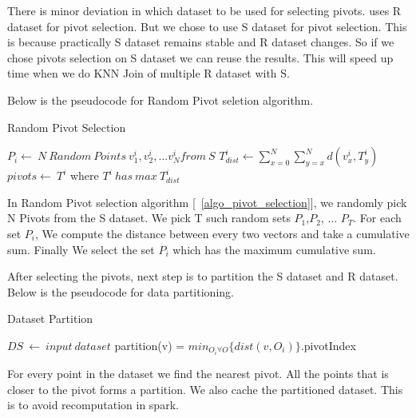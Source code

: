 There is minor deviation in which dataset to be used for selecting
pivots. \cite{lu_efficient_2012} uses R dataset for pivot
selection. But we chose to use S dataset for pivot selection. This is
because practically S dataset remains stable and R dataset changes. So
if we chose pivots selection on S dataset we can reuse the
results. This will speed up time when we do KNN Join of multiple R
dataset with S.

\medskip

Below is the pseudocode for Random Pivot seletion algorithm.

\begin{algorithm}
  \caption{Random Pivot Selection}
  \label{algo_pivot_selection}
  \begin{algorithmic}[1]
    \STATE $P_i  \leftarrow \ N\ Random\ Points\ v^i_1,v^i_2,...v^i_N  from\ S$
    \STATE $T_{dist}^i \leftarrow \sum\limits_{x=0}^N\sum\limits_{y=x}^N d(v^i_x, T^i_y)$
    \ENDFOR
    \STATE $pivots \leftarrow\ T^i$ where $T^i\ has\ max\ T^i_{dist}$
  \end{algorithmic}
\end{algorithm}


In Random Pivot selection algorithm [~\ref{algo_pivot_selection}], we randomly pick N Pivots from the
S dataset. We pick T such random sets {$P_1$,$P_2$, ... $P_T$}. For each set $P_i$, We
compute the distance between every two
vectors and take a cumulative sum. Finally We select the set $P_i$
which has the maximum cumulative sum.

\bigskip

After selecting the pivots, next step is to partition the S dataset
and R dataset. Below is the pseudocode for data partitioning.

\begin{algorithm}
  \caption{Dataset Partition}
  \label{algo_dataset_partition}
  \begin{algorithmic}[1]
    \STATE $DS\ \leftarrow\ input\ dataset$
    \STATE partition(v) = $min_{O_i \forall O}\{dist(v, O_i)\}$.pivotIndex
    \ENDFOR
  \end{algorithmic}
\end{algorithm}


For every point in the dataset we find the nearest pivot. All
the points that is closer to the pivot forms a partition. We also
cache the partitioned dataset. This is to avoid recomputation in
spark.

